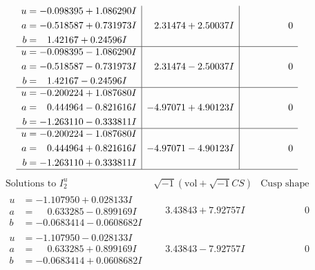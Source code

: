 \documentclass[1p]{elsarticle_modified}
\theoremstyle{definition}
\newcommand{\I}{\sqrt{-1}}
\begin{document}
$$\begin{array}{c|c|c}
\begin{aligned}
u &= -0.098395 + 1.086290 I \\
a &= -0.518587 + 0.731973 I \\
b &= \phantom{-}1.42167 + 0.24596 I\end{aligned}
 & \phantom{-}2.31474 + 2.50037 I & \phantom{-0.000000 } 0 \\ \hline\begin{aligned}
u &= -0.098395 - 1.086290 I \\
a &= -0.518587 - 0.731973 I \\
b &= \phantom{-}1.42167 - 0.24596 I\end{aligned}
 & \phantom{-}2.31474 - 2.50037 I & \phantom{-0.000000 } 0 \\ \hline\begin{aligned}
u &= -0.200224 + 1.087680 I \\
a &= \phantom{-}0.444964 - 0.821616 I \\
b &= -1.263110 - 0.333811 I\end{aligned}
 & -4.97071 + 4.90123 I & \phantom{-0.000000 } 0 \\ \hline\begin{aligned}
u &= -0.200224 - 1.087680 I \\
a &= \phantom{-}0.444964 + 0.821616 I \\
b &= -1.263110 + 0.333811 I\end{aligned}
 & -4.97071 - 4.90123 I & \phantom{-0.000000 } 0\\
 \hline 
 \end{array}$$\newpage$$\begin{array}{c|c|c}  
\text{Solutions to }I^u_{2}& \I (\text{vol} + \sqrt{-1}CS) & \text{Cusp shape}\\
 \hline 
\begin{aligned}
u &= -1.107950 + 0.028133 I \\
a &= \phantom{-}0.633285 - 0.899169 I \\
b &= -0.0683414 - 0.0608682 I\end{aligned}
 & \phantom{-}3.43843 + 7.92757 I & \phantom{-0.000000 } 0 \\ \hline\begin{aligned}
u &= -1.107950 - 0.028133 I \\
a &= \phantom{-}0.633285 + 0.899169 I \\
b &= -0.0683414 + 0.0608682 I\end{aligned}
 & \phantom{-}3.43843 - 7.92757 I & \phantom{-0.000000 } 0 \\ \hline\begin{aligned}

\end{aligned}
\end{array}$$
\end{document}

